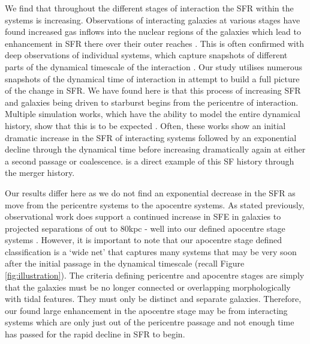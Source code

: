 We find that throughout the different stages of interaction the SFR within the systems is increasing. Observations of interacting galaxies at various stages have found increased gas inflows into the nuclear regions of the galaxies which lead to enhancement in SFR there over their outer reaches \citep{2015A&A...579A..45B}. This is often confirmed with deep observations of individual systems, which capture snapshots of different parts of the dynamical timescale of the interaction \citep{2022MNRAS.514.2769K}. Our study utilises numerous snapshots of the dynamical time of interaction in attempt to build a full picture of the change in SFR. We have found here is that this process of increasing SFR and galaxies being driven to starburst begins from the pericentre of interaction. Multiple simulation works, which have the ability to model the entire dynamical history, show that this is to be expected \citep{2007A&A...468...61D, 2013MNRAS.430.1901H, 2015MNRAS.452.2984K, 2021MNRAS.503.3113M}. Often, these works show an initial dramatic increase in the SFR of interacting systems followed by an exponential decline through the dynamical time before increasing dramatically again at either a second passage or coalescence. \citet{2015MNRAS.448.1107M} is a direct example of this SF history through the merger history.

Our results differ here as we do not find an exponential decrease in the SFR as move from the pericentre systems to the apocentre systems. As stated previously, observational work does support a continued increase in SFE in galaxies to projected separations of out to 80kpc - well into our defined apocentre stage systems \citep[for further examples, see][]{2008MNRAS.385.1903L, 2012MNRAS.426..549S}. However, it is important to note that our apocentre stage defined classification is a `wide net' that captures many systems that may be very soon after the initial passage in the dynamical timescale (recall Figure \ref{fig:illustration}). The criteria defining pericentre and apocentre stages are simply that the galaxies must be no longer connected or overlapping morphologically with tidal features. They must only be distinct and separate galaxies. Therefore, our found large enhancement in the apocentre stage may be from interacting systems which are only just out of the pericentre passage and not enough time has passed for the rapid decline in SFR to begin. 

